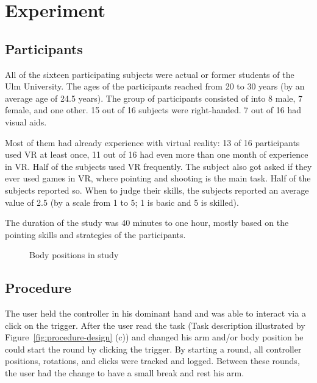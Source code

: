 \section{Experiment}
\label{sec:experiment}

\subsection{Participants}
\label{subsec:participants}

All of the sixteen participating subjects were actual or former students of the Ulm University. The ages of the participants reached from 20 to 30 years (by an average age of 24.5 years). The group of participants consisted of into 8 male, 7 female, and one other. 15 out of 16 subjects were right-handed. 7 out of 16 had visual aids.

Most of them had already experience with virtual reality: 13 of 16 participants used VR at least once, 11 out of 16 had even more than one month of experience in VR. Half of the subjects used VR frequently. The subject also got asked if they ever used games in VR, where pointing and shooting is the main task. Half of the subjects reported so. When to judge their skills, the subjects reported an average value of 2.5 (by a scale from 1 to 5; 1 is basic and 5 is skilled). 

The duration of the study was 40 minutes to one hour, mostly based on the pointing skills and strategies of the participants. 

\begin{figure}[h]
    \centering
    \qquad
    \caption{Body positions in study}
    \label{fig:body_positions}
\end{figure}

\subsection{Procedure}
\label{subsec:procedure}

The user held the controller in his dominant hand and was able to interact via a click on the trigger. After the user read the task (Task description illustrated by Figure~\ref{fig:procedure-design} (c)) and changed his arm and/or body position he could start the round by clicking the trigger. By starting a round, all controller positions, rotations, and clicks were tracked and logged. Between these rounds, the user had the change to have a small break and rest his arm.

